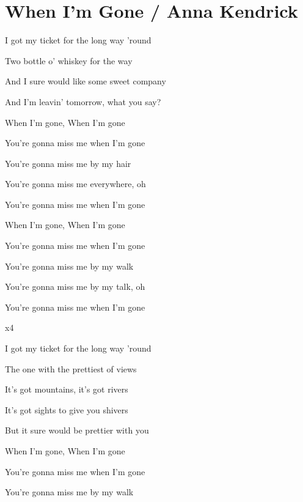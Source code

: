 \section{When I'm Gone / Anna Kendrick}\label{sec:whatsup}

\Cmajor
\Fmajor
\Aminor
\Gmajor

  

I got my ticket for the long way 'round

Two bottle o' whiskey for the way

And I sure would like some sweet company

And I'm leavin' tomorrow, what you say?

When I'm gone, When I'm gone

You're gonna miss me when I'm gone

You're gonna miss me by my hair

You're gonna miss me everywhere, oh

You're gonna miss me when I'm gone

When I'm gone, When I'm gone

You're gonna miss me when I'm gone

You're gonna miss me by my walk

You're gonna miss me by my talk, oh

You're gonna miss me when I'm gone

 x4

I got my ticket for the long way 'round

The one with the prettiest of views

It's got mountains, it's got rivers

It's got sights to give you shivers

But it sure would be prettier with you

When I'm gone, When I'm gone

You're gonna miss me when I'm gone

You're gonna miss me by my walk

